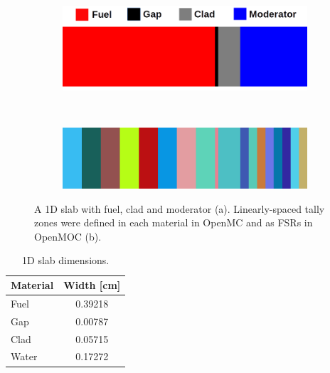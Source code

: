 \begin{figure}[h!]
\begin{subfigure}{\textwidth}
  \centering
  \includegraphics[width=0.7\linewidth]{figures/biases/slab/slab-simple-labels}
  \caption{}
\end{subfigure} \\
\begin{subfigure}{\textwidth}
  \centering
  \includegraphics[width=0.7\linewidth]{figures/biases/slab/slab-8x}
  \caption{}
\end{subfigure}
\caption[1D slab materials and geometry]{A 1D slab with fuel, clad and moderator (a). Linearly-spaced tally zones were defined in each material in OpenMC and as \ac{FSR}s in OpenMOC (b).}
\label{fig:chap4-slab}
\end{figure}

\begin{table}[h!]
  \centering
  \caption{1D slab dimensions.}
  \small
  \label{table:chap4-slab-widths} 
  \vspace{6pt}
  \begin{tabular}{l c}
  \toprule
  \multicolumn{1}{c}{\bf Material} &
  \multicolumn{1}{c}{\bf Width [cm]} \\
  \midrule
  Fuel &  0.39218 \\
  Gap &   0.00787 \\
  Clad &  0.05715 \\
  Water & 0.17272 \\
  \bottomrule
\end{tabular}
\end{table}


